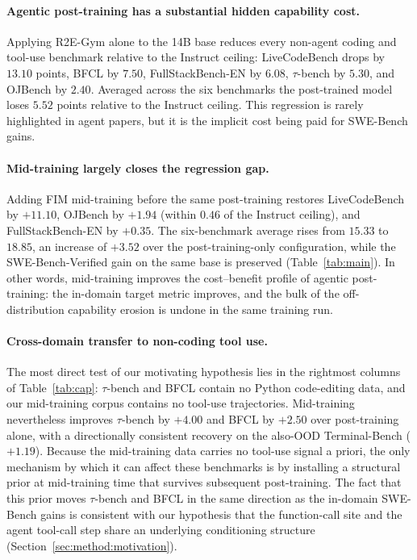 \paragraph{Agentic post-training has a substantial hidden capability cost.}
Applying R2E-Gym alone to the 14B base reduces every non-agent coding and
tool-use benchmark relative to the Instruct ceiling: LiveCodeBench drops
by $13.10$ points, BFCL by $7.50$, FullStackBench-EN by $6.08$,
$\tau$-bench by $5.30$, and OJBench by $2.40$. Averaged across the six
benchmarks the post-trained model loses $5.52$ points relative to the
Instruct ceiling. This regression is rarely highlighted in agent papers,
but it is the implicit cost being paid for SWE-Bench gains.

\paragraph{Mid-training largely closes the regression gap.}
Adding FIM mid-training before the same post-training restores
LiveCodeBench by $+11.10$, OJBench by $+1.94$ (within $0.46$ of the
Instruct ceiling), and FullStackBench-EN by $+0.35$. The six-benchmark
average rises from $15.33$ to $18.85$, an increase of $+3.52$ over the
post-training-only configuration, while the SWE-Bench-Verified gain on
the same base is preserved (Table~\ref{tab:main}). In other words,
mid-training improves the cost--benefit profile of agentic post-training:
the in-domain target metric improves, and the bulk of the off-distribution
capability erosion is undone in the same training run.

\paragraph{Cross-domain transfer to non-coding tool use.}
The most direct test of our motivating hypothesis lies in the rightmost
columns of Table~\ref{tab:cap}: $\tau$-bench and BFCL contain no Python
code-editing data, and our mid-training corpus contains no tool-use
trajectories. Mid-training nevertheless improves $\tau$-bench by
$+4.00$ and BFCL by $+2.50$ over post-training alone, with a directionally
consistent recovery on the also-OOD Terminal-Bench ($+1.19$). Because the
mid-training data carries no tool-use signal a priori, the only mechanism
by which it can affect these benchmarks is by installing a structural
prior at mid-training time that survives subsequent post-training. The
fact that this prior moves $\tau$-bench and BFCL in the same direction
as the in-domain SWE-Bench gains is consistent with our hypothesis that
the function-call site and the agent tool-call step share an underlying
conditioning structure (Section~\ref{sec:method:motivation}).


